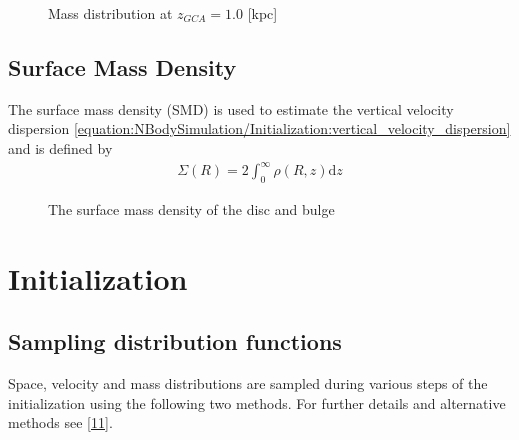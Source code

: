 \documentclass[letterpaper,10pt,english]{sphinxmanual}
\begin{document}
\begin{figure}[htbp]
\centering
\capstart

\noindent{}
\caption{Mass distribution at \(z_{GCA} = 1.0\) {[}kpc{]}}\label{\detokenize{NBodySimulation/Potential:id10}}\label{\detokenize{NBodySimulation/Potential:fig-potential-mass-distribution}}\end{figure}


\section{Surface Mass Density}
\label{\detokenize{NBodySimulation/Potential:surface-mass-density}}
\sphinxAtStartPar
The surface mass density (SMD) is used to estimate the vertical velocity dispersion \eqref{equation:NBodySimulation/Initialization:vertical_velocity_dispersion} and is defined by
\begin{equation}\label{equation:NBodySimulation/Potential:surface_mass_density}
\begin{split}\Sigma \left ( R \right )=2\int_{0}^{\infty}\rho \left ( R,z \right )\mathrm{d}z\end{split}
\end{equation}
\begin{figure}[htbp]
\centering
\capstart

\noindent{}
\caption{The surface mass density of the disc and bulge}\label{\detokenize{NBodySimulation/Potential:id11}}\label{\detokenize{NBodySimulation/Potential:fig-potential-surface-density}}\end{figure}


\chapter{Initialization}
\label{\detokenize{NBodySimulation/Initialization:initialization}}\label{\detokenize{NBodySimulation/Initialization::doc}}

\section{Sampling distribution functions}
\label{\detokenize{NBodySimulation/Initialization:sampling-distribution-functions}}
\sphinxAtStartPar
Space, velocity and mass distributions are sampled during various steps of the initialization using the following two methods.
For further details and alternative methods see {[}\hyperlink{cite.NBodySimulation/Appendix:id43}{11}{]}.
\end{document}
